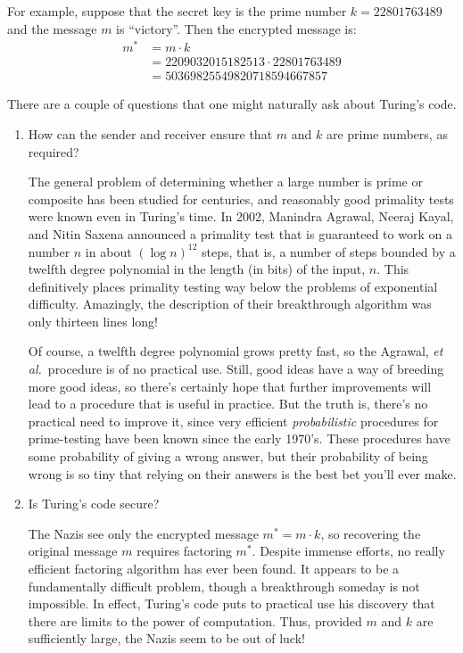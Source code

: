 For example, suppose that the secret key is the prime number $k =
22801763489$ and the message $m$ is ``victory''.  Then the encrypted
message is:
%
\begin{align*}
m^* & = m \cdot k \\
   & = 2209032015182513 \cdot 22801763489 \\
   & = 50369825549820718594667857
\end{align*}

There are a couple of questions that one might naturally ask about Turing's
code.

\begin{enumerate}

\item How can the sender and receiver ensure that $m$ and $k$ are
prime numbers, as required?

The general problem of determining whether a large number is prime or
composite has been studied for centuries, and reasonably good primality
tests were known even in Turing's time.  In 2002, Manindra Agrawal, Neeraj
Kayal, and Nitin Saxena announced a primality test that is guaranteed to
work on a number $n$ in about $(\log n)^{12}$ steps, that is, a number of
steps bounded by a twelfth degree polynomial in the length (in bits) of
the input, $n$.  This definitively places primality testing way below the
problems of exponential difficulty.  Amazingly, the description of their
breakthrough algorithm was only thirteen lines long!

Of course, a twelfth degree polynomial grows pretty fast, so the
Agrawal, \emph{et al.}\ procedure is of no practical use.  Still, good
ideas have a way of breeding more good ideas, so there's certainly
hope that further improvements will lead to a procedure that is useful in
practice.  But the truth is, there's no practical need to improve it,
since very efficient \emph{probabilistic} procedures for prime-testing
have been known since the early 1970's.  These procedures have some
probability of giving a wrong answer, but their probability of being
wrong is so tiny that relying on their answers is the best bet you'll
ever make.

\item Is Turing's code secure?

The Nazis see only the encrypted message $m^* = m \cdot k$, so
recovering the original message $m$ requires factoring $m^*$.  Despite
immense efforts, no really efficient factoring algorithm has ever been
found.  It appears to be a fundamentally difficult problem, though a
breakthrough someday is not impossible.  In effect, Turing's code puts
to practical use his discovery that there are limits to the power of
computation.  Thus, provided $m$ and $k$ are sufficiently large, the
Nazis seem to be out of luck!

\end{enumerate}


